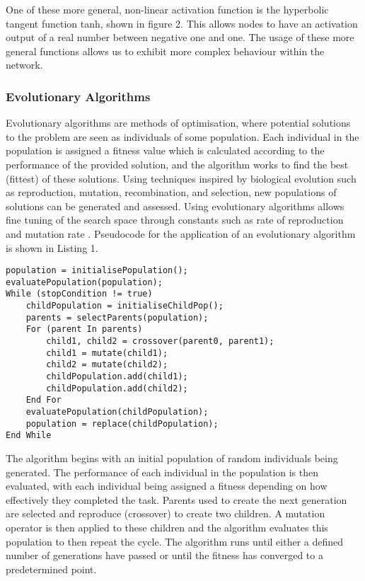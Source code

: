 \documentclass[12pt,a4paper]{article}
\begin{document}
One of these more general, non-linear activation function is the hyperbolic tangent function tanh, shown in figure 2. This allows nodes to have an activation output of a real number between negative one and one. The usage of these more general functions allows us to exhibit more complex behaviour within the network.
\begin{figure}[h]
\end{figure}
\newpage
\subsubsection{Evolutionary Algorithms}
Evolutionary algorithms are methods of optimisation, where potential solutions to the problem are seen as individuals of some population. Each individual in the population is assigned a fitness value which is calculated according to the performance of the provided solution, and the algorithm works to find the best (fittest) of these solutions. Using techniques inspired by biological evolution such as reproduction, mutation, recombination, and selection, new populations of solutions can be generated and assessed. Using evolutionary algorithms allows fine tuning of the search space through constants such as rate of reproduction and mutation rate \cite{gas}. Pseudocode for the application of an evolutionary algorithm is shown in Listing 1.\\
\begin{lstlisting}[caption=Evolutionary algorithm pseudocode]
population = initialisePopulation();
evaluatePopulation(population);
While (stopCondition != true) 
	childPopulation = initialiseChildPop();
	parents = selectParents(population);
	For (parent In parents)
		child1, child2 = crossover(parent0, parent1);
		child1 = mutate(child1);
		child2 = mutate(child2);
		childPopulation.add(child1);
		childPopulation.add(child2);
	End For
	evaluatePopulation(childPopulation);
	population = replace(childPopulation);
End While
\end{lstlisting}

\vspace{4mm}

The algorithm begins with an initial population of random individuals being generated. The performance of each individual in the population is then evaluated, with each individual being assigned a fitness depending on how effectively they completed the task. Parents used to create the next generation are selected and reproduce (crossover) to create two children. A mutation operator is then applied to these children and the algorithm evaluates this population to then repeat the cycle. The algorithm runs until either a defined number of generations have passed or until the fitness has converged to a predetermined point.\\
\newpage
\end{document}

